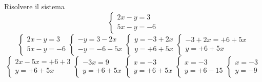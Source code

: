 \begin{exercise}{}
	Risolvere il sistema 
	\[
	\begin{cases}
		2x-y=3\\
		5x-y=-6
	\end{cases}
	\]
	\tcblower
	\[
	\begin{cases}
		2x-y=3\\
		5x-y=-6
	\end{cases}
	\begin{cases}
	-y=3-2x\\
	-y=-6-5x
	\end{cases}
	\begin{cases}
	y=-3+2x\\
	y=+6+5x
	\end{cases}
	\begin{cases}
	-3+2x=+6+5x\\
		y=+6+5x
	\end{cases}
\]
\[
	\begin{cases}
2x-5x=+6+3\\
	y=+6+5x
	\end{cases}
\begin{cases}
	-3x=9\\
	y=+6+5x
\end{cases}
\begin{cases}
	x=-3\\
	y=+6+5x
\end{cases}
\begin{cases}
	x=-3\\
	y=+6-15
\end{cases}
\begin{cases}
	x=-3\\
	y=-9
\end{cases}
	\]
\end{exercise}
